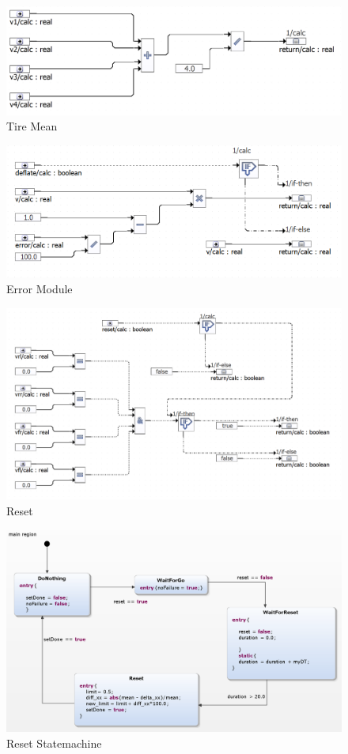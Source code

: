\begin{figure}[h!]
	\centering
	\includegraphics[width=1\linewidth]{../Graphiken/TireMean.png}
	\caption{Tire Mean}
	\label{fig:TireMean}
\end{figure}

\pagebreak


\begin{figure}[h!]
	\centering
	\includegraphics[width=1\linewidth]{../Graphiken/ErrorModule.png}
	\caption{Error Module}
	\label{fig:ErrorModule}
\end{figure}

\begin{figure}[h!]
	\centering
	\includegraphics[width=1\linewidth]{../Graphiken/Reset.png}
	\caption{Reset}
	\label{fig:Reset}
\end{figure}

\begin{figure}[h!]
	\centering
	\includegraphics[width=1\linewidth]{../Graphiken/ResetStateMachine.png}
	\caption{Reset Statemachine}
	\label{fig:ResetStateMachine}
\end{figure}